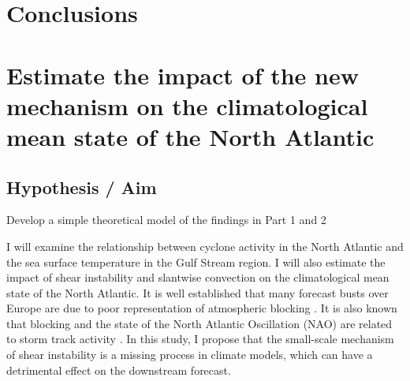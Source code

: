 \section{Conclusions}







\section{Estimate the impact of the new mechanism on the climatological mean state of the North Atlantic}

\subsection{ Hypothesis / Aim}
Develop a simple theoretical model of the findings in Part 1 and 2






I will examine the relationship between cyclone activity in the North Atlantic and the sea surface temperature in the Gulf Stream region. I will also estimate the impact of shear instability and slantwise convection on the climatological mean state of the North Atlantic. It is well established that many forecast busts over Europe are due to poor representation of atmospheric blocking \cite{rodwell2013characteristics}. It is also known that blocking and the state of the North Atlantic Oscillation (NAO) are related to storm track activity \citep{vallis2008local}. In this study, I propose that the small-scale mechanism of shear instability is a missing process in climate models, which can have a detrimental effect on the downstream forecast.

